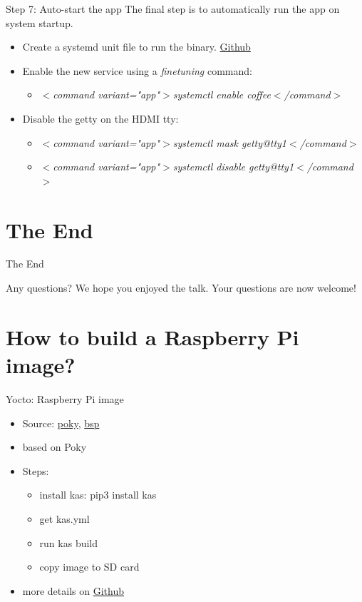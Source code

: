 \documentclass{beamer}
\begin{document}
\begin{frame}{Step 7: Auto-start the app}
	The final step is to automatically run the app on system startup.
	\begin{itemize}
		\item Create a systemd unit file to run the binary.
		\href{https://github.com/tomirgang/eh21_maintainable_linux/blob/main/examples/elbe_advanced/image/rpi-image/overlays/systemd/etc/systemd/system/coffee.service}{Github}
		\item Enable the new service using a \emph{finetuning} command:
		\begin{itemize}
			\item \emph{$<$command variant="app"$>$systemctl enable coffee$<$/command$>$}
		\end{itemize}
		\item Disable the getty on the HDMI tty:
		\begin{itemize}
			\item \emph{$<$command variant="app"$>$systemctl mask getty@tty1$<$/command$>$}
			\item \emph{$<$command variant="app"$>$systemctl disable getty@tty1$<$/command$>$}
		\end{itemize}
	\end{itemize}
\end{frame}

\section{The End}

\begin{frame}{The End}
	\begin{block}{Any questions?}
		We hope you enjoyed the talk.
		Your questions are now welcome!
	\end{block}
\end{frame}

\section{How to build a Raspberry Pi image?}


\begin{frame}{Yocto: Raspberry Pi image}
	\begin{itemize}
		\item Source: \href{https://git.yoctoproject.org/poky}{poky}, \href{https://git.yoctoproject.org/meta-raspberrypi/}{bsp}
		\item based on Poky
		\item Steps:
		\begin{itemize}
			\item install kas: pip3 install kas
			\item get kas.yml
			\item run kas build
			\item copy image to SD card
		\end{itemize}
		\item more details on \href{https://github.com/tomirgang/eh21_maintainable_linux/tree/main/examples/first_build_rpi4/yocto}{Github}
	\end{itemize}
\end{frame}
\end{document}
